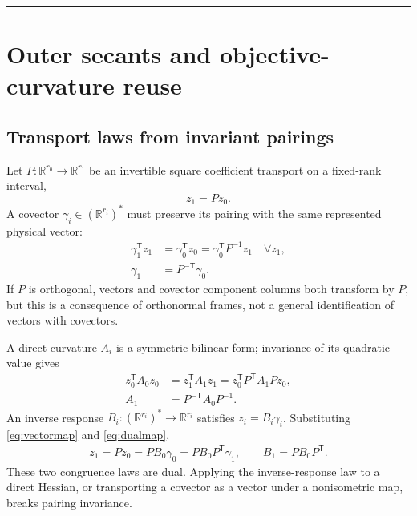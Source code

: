 \documentclass[10pt,twocolumn]{article}
\theoremstyle{definition}
\theoremstyle{remark}
\newcommand{\conceptbreak}{\par\vspace{0.45em}\noindent\textcolor{navy!55}{\rule{\columnwidth}{0.35pt}}\vspace{0.35em}\par}
\newcommand{\R}{\mathbb R}
\begin{document}
\conceptbreak

\section{Outer secants and objective-curvature reuse}
\label{sec:curvature}

\subsection{Transport laws from invariant pairings}

Let $P:\R^{r_0}\to\R^{r_1}$ be an invertible square coefficient transport on a fixed-rank interval,
\begin{equation}
 z_1=Pz_0.
 \label{eq:vectormap}
\end{equation}
A covector $\gamma_i\in(\R^{r_i})^*$ must preserve its pairing with the same represented physical vector:
\begin{align}
 \gamma_1^{\mathsf T}z_1&=\gamma_0^{\mathsf T}z_0
 =\gamma_0^{\mathsf T}P^{-1}z_1
 \quad\forall z_1,\nonumber\\
 \gamma_1&=P^{-\mathsf T}\gamma_0.
 \label{eq:dualmap}
\end{align}
If $P$ is orthogonal, vectors and covector component columns both transform by $P$, but this is a consequence of orthonormal frames, not a general identification of vectors with covectors.

A direct curvature $A_i$ is a symmetric bilinear form; invariance of its quadratic value gives
\begin{align}
 z_0^{\mathsf T}A_0z_0
 &=z_1^{\mathsf T}A_1z_1
 =z_0^{\mathsf T}P^{\mathsf T}A_1Pz_0,\nonumber\\
 A_1&=P^{-\mathsf T}A_0P^{-1}.
 \label{eq:directtransport}
\end{align}
An inverse response $B_i:(\R^{r_i})^*\to\R^{r_i}$ satisfies $z_i=B_i\gamma_i$.  Substituting \eqref{eq:vectormap} and \eqref{eq:dualmap},
\begin{align}
 z_1=Pz_0=PB_0\gamma_0=PB_0P^{\mathsf T}\gamma_1,\qquad
 B_1=PB_0P^{\mathsf T}.
 \label{eq:inversetransport}
\end{align}
These two congruence laws are dual.  Applying the inverse-response law to a direct Hessian, or transporting a covector as a vector under a nonisometric map, breaks pairing invariance.
\end{document}
